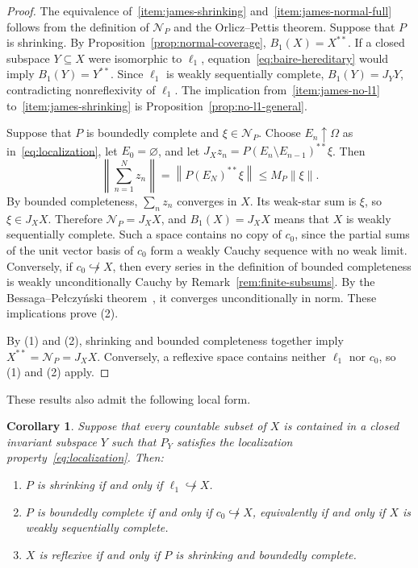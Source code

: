 \documentclass[11pt,leqno]{amsart}
\theoremstyle{compact}
\numberwithin{equation}{section}
\newtheorem{corollary}[theorem]{Corollary}
\theoremstyle{compactremark}
\theoremstyle{compact}
\newcommand{\1}{\mathbbm{1}}
\newcommand{\norm}[1]{\left\|#1\right\|}
\begin{document}
\begin{proof}
The equivalence of~\ref{item:james-shrinking} and~\ref{item:james-normal-full} follows from the definition of $\mathcal N_P$ and the Orlicz--Pettis theorem. Suppose that $P$ is shrinking. By Proposition~\ref{prop:normal-coverage}, $B_1(X)=X^{**}$. If a closed subspace $Y\subseteq X$ were isomorphic to $\ell_1$, equation~\eqref{eq:baire-hereditary} would imply $B_1(Y)=Y^{**}$. Since $\ell_1$ is weakly sequentially complete, $B_1(Y)=J_YY$, contradicting nonreflexivity of $\ell_1$. The implication from~\ref{item:james-no-l1} to~\ref{item:james-shrinking} is Proposition~\ref{prop:no-l1-general}.

Suppose that $P$ is boundedly complete and $\xi\in \mathcal N_P$. Choose $E_n\uparrow\Omega$ as in~\eqref{eq:localization}, let $E_0=\varnothing$, and let $J_Xz_n=P(E_n\setminus E_{n-1})^{**}\xi$. Then
\[
\norm{\sum_{n=1}^Nz_n}=\norm{P(E_N)^{**}\xi}\leq M_P\norm{\xi}.
\]
By bounded completeness, $\sum_nz_n$ converges in $X$. Its weak-star sum is $\xi$, so $\xi\in J_XX$. Therefore $\mathcal N_P=J_XX$, and $B_1(X)=J_XX$ means that $X$ is weakly sequentially complete. Such a space contains no copy of $c_0$, since the partial sums of the unit vector basis of $c_0$ form a weakly Cauchy sequence with no weak limit. Conversely, if $c_0\not\hookrightarrow X$, then every series in the definition of bounded completeness is weakly unconditionally Cauchy by Remark~\ref{rem:finite-subsums}. By the Bessaga--Pe\l czy\'nski theorem~\cite{BessagaPelczynski1958}, it converges unconditionally in norm. These implications prove (2).

By (1) and (2), shrinking and bounded completeness together imply $X^{**}=\mathcal N_P=J_XX$. Conversely, a reflexive space contains neither $\ell_1$ nor $c_0$, so (1) and (2) apply.
\end{proof}

These results also admit the following local form.

\begin{corollary}\label{cor:local-representation-james}
Suppose that every countable subset of $X$ is contained in a closed invariant subspace $Y$ such that $P_Y$ satisfies the localization property~\eqref{eq:localization}. Then:
\begin{enumerate}
\item $P$ is shrinking if and only if $\ell_1\not\hookrightarrow X$.
\item $P$ is boundedly complete if and only if $c_0\not\hookrightarrow X$, equivalently if and only if $X$ is weakly sequentially complete.
\item $X$ is reflexive if and only if $P$ is shrinking and boundedly complete.
\end{enumerate}
\end{corollary}
\end{document}
